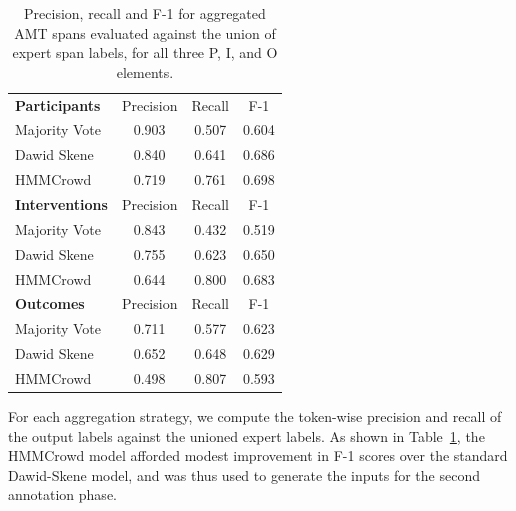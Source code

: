 \documentclass[11pt,a4paper]{article}
\begin{document}

\begin{table}%
    \centering
    \small
    \begin{tabular}{  l c c c  }
        \hline
        \textbf{Participants} & Precision & Recall & F-1 \\
        \cline{2-4}
        Majority Vote   & 0.903  & 0.507  & 0.604  \\
        Dawid Skene     & 0.840  & 0.641  & 0.686  \\
        HMMCrowd        & 0.719  & 0.761  & 0.698  \\
        \hline
        \textbf{Interventions} & Precision & Recall & F-1 \\
        \cline{2-4}
        Majority Vote   & 0.843  & 0.432  & 0.519  \\
        Dawid Skene     & 0.755  & 0.623  & 0.650  \\
        HMMCrowd        & 0.644  & 0.800  & 0.683  \\
        \hline
        \textbf{Outcomes} & Precision & Recall & F-1 \\
        \cline{2-4}
        Majority Vote   & 0.711  & 0.577  & 0.623  \\
        Dawid Skene     & 0.652  & 0.648  & 0.629  \\
        HMMCrowd        & 0.498  & 0.807  & 0.593  \\
    \end{tabular}
    \caption{Precision, recall and F-1 for aggregated AMT spans evaluated against the union of expert span labels, for all three P, I, and O elements.}
    \label{tab:basic_exp}
\end{table}

For each aggregation strategy, we compute the token-wise precision and recall of the output labels against the unioned expert labels.
As shown in Table~\ref{tab:basic_exp}, the HMMCrowd model afforded modest improvement in F-1 scores over the standard Dawid-Skene model, and was thus used to generate the inputs for the second annotation phase.
\end{document}
